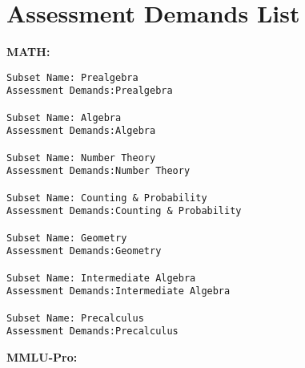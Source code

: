 \section{Assessment Demands List}
\label{sec:demands}
\textbf{MATH:}
\label{sec:demand_math}
\begin{lstlisting}
Subset Name: Prealgebra
Assessment Demands:Prealgebra

Subset Name: Algebra
Assessment Demands:Algebra

Subset Name: Number Theory
Assessment Demands:Number Theory

Subset Name: Counting & Probability
Assessment Demands:Counting & Probability

Subset Name: Geometry
Assessment Demands:Geometry

Subset Name: Intermediate Algebra
Assessment Demands:Intermediate Algebra

Subset Name: Precalculus
Assessment Demands:Precalculus
\end{lstlisting}
\textbf{MMLU-Pro:}
\label{sec:demand_mmlupro}
